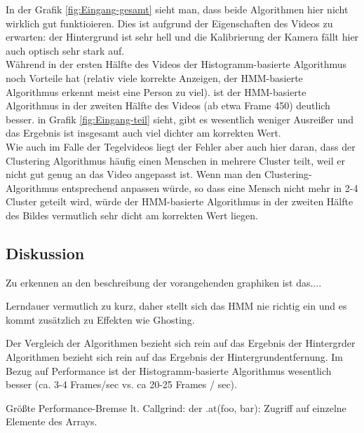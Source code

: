 In der Grafik \ref{fig:Eingang-gesamt} sieht man, dass beide Algorithmen hier nicht wirklich gut funktioieren.
Dies ist aufgrund der Eigenschaften des Videos zu erwarten: der Hintergrund ist sehr hell und die Kalibrierung der Kamera fällt hier auch optisch sehr stark auf.\\
Während in der ersten Hälfte des Videos der Histogramm-basierte Algorithmus noch Vorteile hat (relativ viele korrekte Anzeigen, der HMM-basierte Algorithmus erkennt meist eine Person zu viel). ist der HMM-basierte Algorithmus in der zweiten Hälfte des Videos (ab etwa Frame 450) deutlich besser.
in Grafik \ref{fig:Eingang-teil} sieht, gibt es wesentlich weniger Ausreißer und das Ergebnis ist insgesamt auch viel dichter am korrekten Wert.\\
Wie auch im Falle der Tegelvideos liegt der Fehler aber auch hier daran, dass der Clustering Algorithmus häufig einen Menschen in mehrere Cluster teilt, weil er nicht gut genug an das Video angepasst ist. Wenn man den Clustering-Algorithmus entsprechend anpassen würde, so dass eine Mensch nicht mehr in 2-4 Cluster geteilt wird, würde der HMM-basierte Algorithmus in der zweiten Hälfte des Bildes vermutlich sehr dicht am korrekten Wert liegen.

\subsection{Diskussion}
\label{sec:diskuss}

Zu erkennen an den beschreibung der vorangehenden graphiken ist das....

Lerndauer vermutlich zu kurz, daher stellt sich das HMM nie richtig ein und es kommt zusätzlich zu Effekten wie Ghosting.

Der Vergleich der Algorithmen bezieht sich rein auf das Ergebnis der Hintergrder Algorithmen bezieht sich rein auf das Ergebnis der Hintergrundentfernung.
Im Bezug auf Performance ist der Histogramm-basierte Algorithmus wesentlich besser (ca. 3-4 Frames/sec vs. ca 20-25 Frames / sec).

Größte Performance-Bremse lt. Callgrind: der .at(foo, bar): Zugriff auf einzelne Elemente des Arrays.

